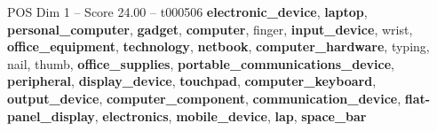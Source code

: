 \begin{textsample}{POS Dim 1 – Score 24.00 – t000506}  \label{ex:f1_pos_033}
\textbf{electronic\_device}, \textbf{laptop}, \textbf{personal\_computer}, \textbf{gadget}, \textbf{computer}, finger, \textbf{input\_device}, wrist, \textbf{office\_equipment}, \textbf{technology}, \textbf{netbook}, \textbf{computer\_hardware}, typing, nail, thumb, \textbf{office\_supplies}, \textbf{portable\_communications\_device}, \textbf{peripheral}, \textbf{display\_device}, \textbf{touchpad}, \textbf{computer\_keyboard}, \textbf{output\_device}, \textbf{computer\_component}, \textbf{communication\_device}, \textbf{flat-panel\_display}, \textbf{electronics}, \textbf{mobile\_device}, \textbf{lap}, \textbf{space\_bar}

\end{textsample}

